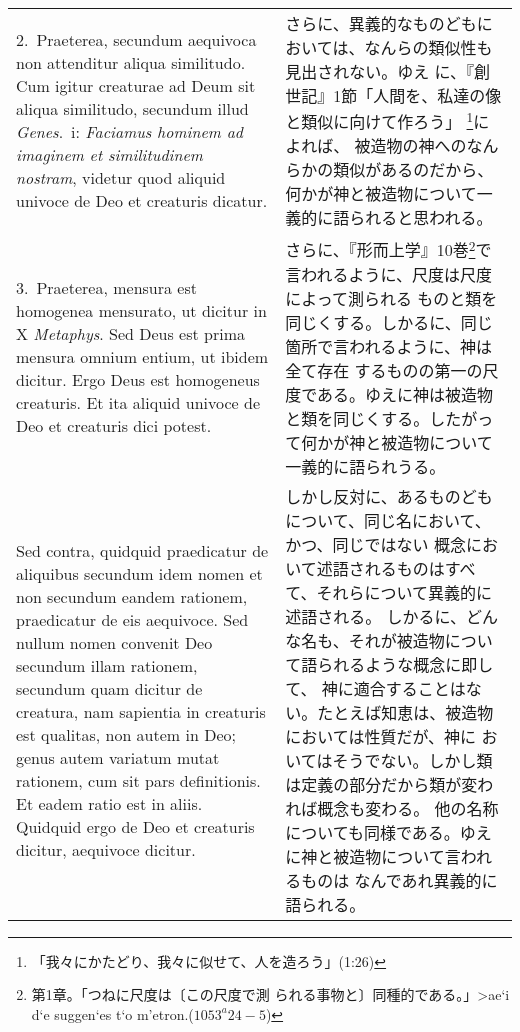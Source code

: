 \documentclass[10pt]{jsarticle} %
\begin{document}
\begin{longtable}{p{21em}p{21em}}
\\

2.~{\sc Praeterea}, secundum aequivoca non attenditur aliqua
similitudo. Cum igitur creaturae ad Deum sit aliqua similitudo,
secundum illud {\it Genes}.\ {\sc i}: {\it Faciamus hominem ad
imaginem et similitudinem nostram}, videtur quod aliquid univoce de
Deo et creaturis dicatur.

&

さらに、異義的なものどもにおいては、なんらの類似性も見出されない。ゆえ
に、『創世記』1節「人間を、私達の像と類似に向けて作ろう」
\footnote{「我々にかたどり、我々に似せて、人を造ろう」(1:26)}によれば、
被造物の神へのなんらかの類似があるのだから、何かが神と被造物について一
義的に語られると思われる。

\\


3.~{\sc Praeterea}, mensura est homogenea mensurato, ut dicitur in X
{\it Metaphys}. Sed Deus est prima mensura omnium entium, ut ibidem
dicitur. Ergo Deus est homogeneus creaturis. Et ita aliquid univoce de
Deo et creaturis dici potest.


&

さらに、『形而上学』10巻\footnote{第1章。「つねに尺度は〔この尺度で測
られる事物と〕同種的である。」\textgreek{>ae`i d`e suggen`es t`o
m'etron.}($1053^{a}24-5$)}で言われるように、尺度は尺度によって測られる
ものと類を同じくする。しかるに、同じ箇所で言われるように、神は全て存在
するものの第一の尺度である。ゆえに神は被造物と類を同じくする。したがっ
て何かが神と被造物について一義的に語られうる。

\\


{\sc Sed contra}, quidquid praedicatur de aliquibus secundum idem
nomen et non secundum eandem rationem, praedicatur de eis
aequivoce. Sed nullum nomen convenit Deo secundum illam rationem,
secundum quam dicitur de creatura, nam sapientia in creaturis est
qualitas, non autem in Deo; genus autem variatum mutat rationem, cum
sit pars definitionis. Et eadem ratio est in aliis. Quidquid ergo de
Deo et creaturis dicitur, aequivoce dicitur.


&

しかし反対に、あるものどもについて、同じ名において、かつ、同じではない
概念において述語されるものはすべて、それらについて異義的に述語される。
しかるに、どんな名も、それが被造物について語られるような概念に即して、
神に適合することはない。たとえば知恵は、被造物においては性質だが、神に
おいてはそうでない。しかし類は定義の部分だから類が変われば概念も変わる。
他の名称についても同様である。ゆえに神と被造物について言われるものは
なんであれ異義的に語られる。


\end{longtable}
\end{document}
